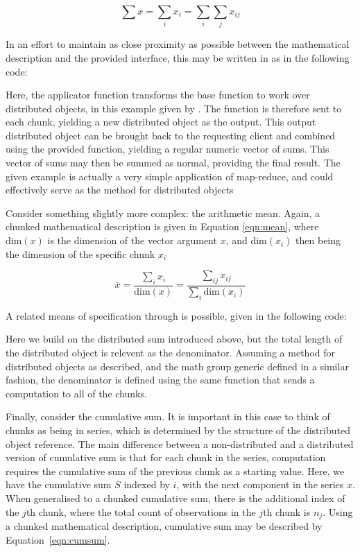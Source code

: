 \documentclass[letterpaper, inpress]{jds} %
\begin{document}
\begin{equation}\label{eqn:sum}
    \sum x = \sum_i x_i= \sum_i\sum_j x_{ij}
\end{equation}

In an effort to maintain as close proximity as possible between the mathematical description and the provided interface, this may be written in  as in the following  code:


Here, the  applicator function transforms the base  function to work over distributed objects, in this example given by .
The  function is therefore sent to each chunk, yielding a new distributed object as the output.
This output distributed object can be brought back to the requesting client and combined using the provided  function, yielding a regular  numeric vector of sums.
This vector of sums may then be summed as normal, providing the final result.
The given example is actually a very simple application of map-reduce, and could effectively serve as the  method for distributed objects

Consider something slightly more complex: the arithmetic mean.
Again, a chunked mathematical description is given in Equation \ref{eqn:mean}, where $\textrm{dim}(x)$ is the dimension of the vector argument $x$, and $\textrm{dim}(x_i)$ then being the dimension of the specific chunk $x_i$

\begin{equation}\label{eqn:mean}
    \overline{x} = \frac{\sum_{i}x_{i}}{\textrm{dim}(x)} = \frac{\sum_{ij}x_{ij}}{\sum_i \textrm{dim}(x_i)}
\end{equation}

A related means of specification through  is possible, given in the following code:


Here we build on the distributed sum introduced above, but the total length of the distributed object is relevent as the denominator.
Assuming a  method for distributed objects as described, and the math group generic defined in a similar fashion, the denominator is defined using the same  function that sends a  computation to all of the chunks.

Finally, consider the cumulative sum.
It is important in this case to think of chunks as being in series, which is determined by the structure of the distributed object reference.
The main difference between a non-distributed and a distributed version of cumulative sum is that for each chunk in the series, computation requires the cumulative sum of the previous chunk as a starting value.
Here, we have the cumulative sum $S$ indexed by $i$, with the next component in the series $x$.
When generalised to a chunked cumulative sum, there is the additional index of the $j$th chunk, where the total count of observations in the $j$th chunk is $n_j$.
Using a chunked mathematical description, cumulative sum may be described by Equation~\ref{eqn:cumsum}.
\end{document}
